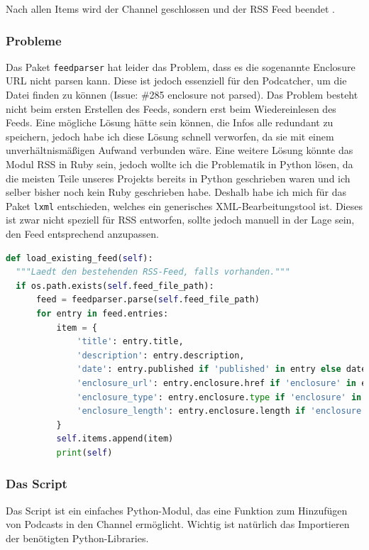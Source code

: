 \documentclass{article}
\begin{document}
Nach allen Items wird der Channel geschlossen und der RSS Feed beendet \cite{rss}.

\subsubsection{Probleme}
Das Paket \texttt{feedparser} \cite{feedparser} hat leider das Problem, dass es die sogenannte Enclosure URL nicht parsen kann. Diese ist jedoch essenziell für den Podcatcher, um die Datei finden zu können (Issue: \#285 enclosure not parsed). Das Problem besteht nicht beim ersten Erstellen des Feeds, sondern erst beim Wiedereinlesen des Feeds. Eine mögliche Lösung hätte sein können, die Infos alle redundant zu speichern, jedoch habe ich diese Lösung schnell verworfen, da sie mit einem unverhältnismäßigen Aufwand verbunden wäre. Eine weitere Lösung könnte das Modul RSS in Ruby sein, jedoch wollte ich die Problematik in Python lösen, da die meisten Teile unseres Projekts bereits in Python geschrieben waren und ich selber bisher noch kein Ruby geschrieben habe.
Deshalb habe ich mich für das Paket \texttt{lxml} \cite{lxml} entschieden, welches ein generisches XML-Bearbeitungstool ist. Dieses ist zwar nicht speziell für RSS entworfen, sollte jedoch manuell in der Lage sein, den Feed entsprechend anzupassen.

\begin{lstlisting}[language=Python, caption=Feedparser Bug]
def load_existing_feed(self):
  """Laedt den bestehenden RSS-Feed, falls vorhanden."""
  if os.path.exists(self.feed_file_path):
      feed = feedparser.parse(self.feed_file_path)
      for entry in feed.entries:
          item = {
              'title': entry.title,
              'description': entry.description,
              'date': entry.published if 'published' in entry else datetime.now().isoformat(),
              'enclosure_url': entry.enclosure.href if 'enclosure' in entry else None,
              'enclosure_type': entry.enclosure.type if 'enclosure' in entry else None,
              'enclosure_length': entry.enclosure.length if 'enclosure' in entry else None
          }
          self.items.append(item)
          print(self)
\end{lstlisting}

\subsubsection{Das Script}
Das Script ist ein einfaches Python-Modul, das eine Funktion zum Hinzufügen von Podcasts in den Channel ermöglicht. Wichtig ist natürlich das Importieren der benötigten Python-Libraries.
\end{document}
